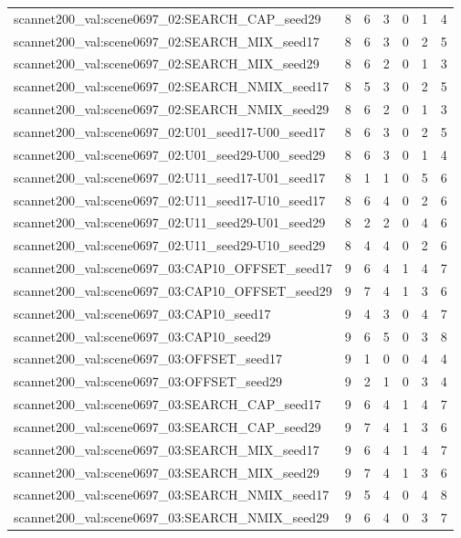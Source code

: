\begin{table}[t]
\begin{tabular}{lrrrrrr}
scannet200\_val:scene0697\_02:SEARCH\_CAP\_seed29 & 8 & 6 & 3 & 0 & 1 & 4 \\
scannet200\_val:scene0697\_02:SEARCH\_MIX\_seed17 & 8 & 6 & 3 & 0 & 2 & 5 \\
scannet200\_val:scene0697\_02:SEARCH\_MIX\_seed29 & 8 & 6 & 2 & 0 & 1 & 3 \\
scannet200\_val:scene0697\_02:SEARCH\_NMIX\_seed17 & 8 & 5 & 3 & 0 & 2 & 5 \\
scannet200\_val:scene0697\_02:SEARCH\_NMIX\_seed29 & 8 & 6 & 2 & 0 & 1 & 3 \\
scannet200\_val:scene0697\_02:U01\_seed17-U00\_seed17 & 8 & 6 & 3 & 0 & 2 & 5 \\
scannet200\_val:scene0697\_02:U01\_seed29-U00\_seed29 & 8 & 6 & 3 & 0 & 1 & 4 \\
scannet200\_val:scene0697\_02:U11\_seed17-U01\_seed17 & 8 & 1 & 1 & 0 & 5 & 6 \\
scannet200\_val:scene0697\_02:U11\_seed17-U10\_seed17 & 8 & 6 & 4 & 0 & 2 & 6 \\
scannet200\_val:scene0697\_02:U11\_seed29-U01\_seed29 & 8 & 2 & 2 & 0 & 4 & 6 \\
scannet200\_val:scene0697\_02:U11\_seed29-U10\_seed29 & 8 & 4 & 4 & 0 & 2 & 6 \\
scannet200\_val:scene0697\_03:CAP10\_OFFSET\_seed17 & 9 & 6 & 4 & 1 & 4 & 7 \\
scannet200\_val:scene0697\_03:CAP10\_OFFSET\_seed29 & 9 & 7 & 4 & 1 & 3 & 6 \\
scannet200\_val:scene0697\_03:CAP10\_seed17 & 9 & 4 & 3 & 0 & 4 & 7 \\
scannet200\_val:scene0697\_03:CAP10\_seed29 & 9 & 6 & 5 & 0 & 3 & 8 \\
scannet200\_val:scene0697\_03:OFFSET\_seed17 & 9 & 1 & 0 & 0 & 4 & 4 \\
scannet200\_val:scene0697\_03:OFFSET\_seed29 & 9 & 2 & 1 & 0 & 3 & 4 \\
scannet200\_val:scene0697\_03:SEARCH\_CAP\_seed17 & 9 & 6 & 4 & 1 & 4 & 7 \\
scannet200\_val:scene0697\_03:SEARCH\_CAP\_seed29 & 9 & 7 & 4 & 1 & 3 & 6 \\
scannet200\_val:scene0697\_03:SEARCH\_MIX\_seed17 & 9 & 6 & 4 & 1 & 4 & 7 \\
scannet200\_val:scene0697\_03:SEARCH\_MIX\_seed29 & 9 & 7 & 4 & 1 & 3 & 6 \\
scannet200\_val:scene0697\_03:SEARCH\_NMIX\_seed17 & 9 & 5 & 4 & 0 & 4 & 8 \\
scannet200\_val:scene0697\_03:SEARCH\_NMIX\_seed29 & 9 & 6 & 4 & 0 & 3 & 7 \\

\end{tabular}
\end{table}
